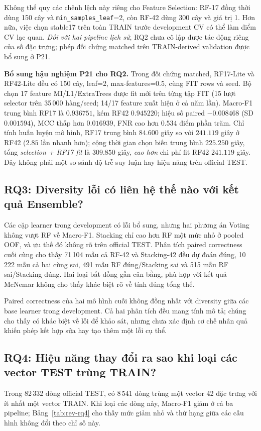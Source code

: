 Không thể quy các chênh lệch này riêng cho Feature Selection: RF-17 đồng thời dùng 150 cây và \texttt{min\_samples\_leaf}=2, còn RF-42 dùng 300 cây và giá trị 1. Hơn nữa, việc chọn stable17 trên toàn TRAIN trước development CV có thể làm điểm CV lạc quan. \emph{Đối với hai pipeline lịch sử}, RQ2 chưa cô lập được tác động riêng của số đặc trưng; phép đối chứng matched trên TRAIN-derived validation được bổ sung ở P21.

\noindent\textbf{Bổ sung hậu nghiệm P21 cho RQ2.}
Trong đối chứng matched, RF17-Lite và RF42-Lite đều có 150 cây, leaf=2, max-features=0.5, cùng FIT rows và seed. Bộ chọn 17 feature MI/L1/ExtraTrees được fit mới trên từng tập FIT (15 lượt selector trên 35\,000 hàng/seed; 14/17 feature xuất hiện ở cả năm lần). Macro-F1 trung bình RF17 là $0.936751$, kém RF42 $0.945220$; hiệu số paired $-0.008468$ (SD $0.001594$), MCC thấp hơn $0.016939$, FNR cao hơn $0.534$ điểm phần trăm. Chỉ tính huấn luyện mô hình, RF17 trung bình $84.600$ giây so với $241.119$ giây ở RF42 ($2.85$ lần nhanh hơn); cộng thời gian chọn biến trung bình $225.250$ giây, tổng \emph{selection + RF17 fit} là $309.850$ giây, \emph{cao hơn} chi phí fit RF42 $241.119$ giây. Đây không phải một so sánh độ trễ suy luận hay hiệu năng trên official TEST.

\subsection{RQ3: Diversity lỗi có liên hệ thế nào với kết quả Ensemble?}
\label{sec:revision-rq3}
Các cặp learner trong development có lỗi bổ sung, nhưng hai phương án Voting không vượt RF về Macro-F1. Stacking chỉ cao hơn RF một mức nhỏ ở pooled OOF, và ưu thế đó không rõ trên official TEST. Phân tích paired correctness cuối cùng cho thấy 71\,104 mẫu cả RF-42 và Stacking-42 đều dự đoán đúng, 10\,222 mẫu cả hai cùng sai, 491 mẫu RF đúng/Stacking sai và 515 mẫu RF sai/Stacking đúng. Hai loại bất đồng gần cân bằng, phù hợp với kết quả McNemar không cho thấy khác biệt rõ về tính đúng tổng thể.

Paired correctness của hai mô hình cuối không đồng nhất với diversity giữa các base learner trong development. Cả hai phân tích đều mang tính mô tả; chúng cho thấy có khác biệt về lỗi để khảo sát, nhưng chưa xác định cơ chế nhân quả khiến phép kết hợp sửa hay tạo thêm một lỗi cụ thể.

\subsection{RQ4: Hiệu năng thay đổi ra sao khi loại các vector TEST trùng TRAIN?}
\label{sec:revision-rq4}
Trong 82\,332 dòng official TEST, có 8\,541 dòng trùng một vector 42 đặc trưng với ít nhất một vector TRAIN. Khi loại các dòng này, Macro-F1 giảm ở cả ba pipeline; Bảng~\ref{tab:rev-rq4} cho thấy mức giảm nhỏ và thứ hạng giữa các cấu hình không đổi theo chỉ số này.


